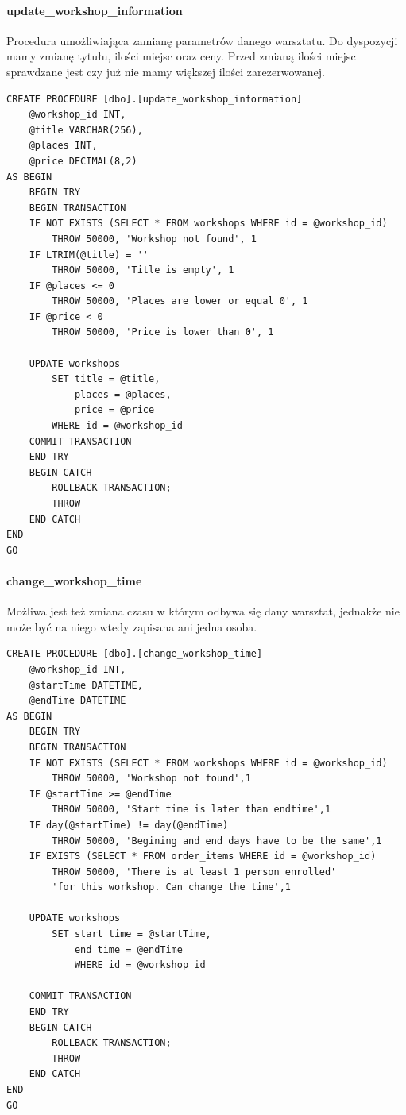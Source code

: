 \documentclass[12pt]{article}
\begin{document}
\paragraph{update\_workshop\_information\\}
Procedura umożliwiająca zamianę parametrów danego warsztatu. Do dyspozycji mamy zmianę tytułu, ilości miejsc oraz ceny. Przed zmianą ilości miejsc sprawdzane jest czy już nie mamy większej ilości zarezerwowanej. \\
\begin{lstlisting}
CREATE PROCEDURE [dbo].[update_workshop_information]
	@workshop_id INT,
	@title VARCHAR(256),
	@places INT,
	@price DECIMAL(8,2)
AS BEGIN
	BEGIN TRY
	BEGIN TRANSACTION
	IF NOT EXISTS (SELECT * FROM workshops WHERE id = @workshop_id)
		THROW 50000, 'Workshop not found', 1
	IF LTRIM(@title) = ''
		THROW 50000, 'Title is empty', 1
	IF @places <= 0
		THROW 50000, 'Places are lower or equal 0', 1
	IF @price < 0
		THROW 50000, 'Price is lower than 0', 1

	UPDATE workshops
		SET	title = @title,
			places = @places,
			price = @price
		WHERE id = @workshop_id
	COMMIT TRANSACTION
	END TRY
	BEGIN CATCH
		ROLLBACK TRANSACTION;
		THROW
	END CATCH
END
GO
\end{lstlisting}
\newpage

\paragraph{change\_workshop\_time \\}
Możliwa jest też zmiana czasu w którym odbywa się dany warsztat, jednakże nie może być na niego wtedy zapisana ani jedna osoba. \\
\begin{lstlisting}
CREATE PROCEDURE [dbo].[change_workshop_time]
	@workshop_id INT,
	@startTime DATETIME,
	@endTime DATETIME
AS BEGIN
	BEGIN TRY
	BEGIN TRANSACTION
	IF NOT EXISTS (SELECT * FROM workshops WHERE id = @workshop_id)
		THROW 50000, 'Workshop not found',1
	IF @startTime >= @endTime
		THROW 50000, 'Start time is later than endtime',1
	IF day(@startTime) != day(@endTime)
		THROW 50000, 'Begining and end days have to be the same',1
	IF EXISTS (SELECT * FROM order_items WHERE id = @workshop_id)
		THROW 50000, 'There is at least 1 person enrolled'
        'for this workshop. Can change the time',1

	UPDATE workshops
		SET start_time = @startTime,
			end_time = @endTime
			WHERE id = @workshop_id

	COMMIT TRANSACTION
	END TRY
	BEGIN CATCH
		ROLLBACK TRANSACTION;
		THROW
	END CATCH
END
GO
\end{lstlisting}
\newpage
\end{document}
